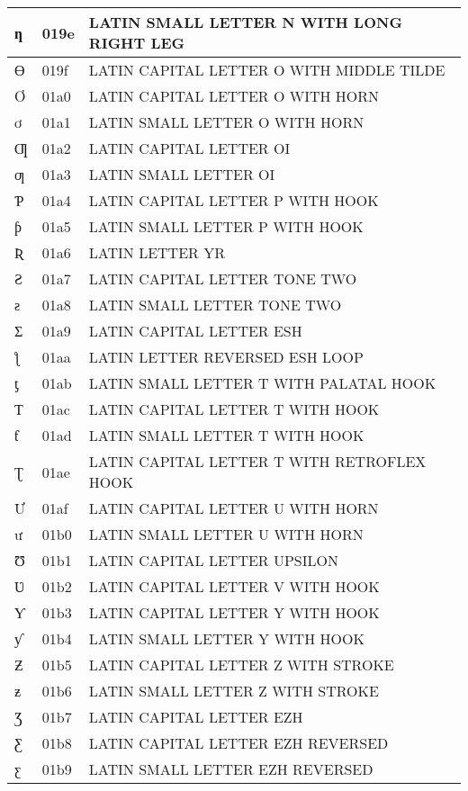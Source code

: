 \documentclass[12pt,letterpaper,openany]{book}
\begin{document}
\begin{center}
\begin{supertabular}{|m{0.25in}|m{0.5in}|m{4in}|}
			ƞ & 019e & LATIN SMALL LETTER N WITH LONG RIGHT LEG\\\hline
			Ɵ & 019f & LATIN CAPITAL LETTER O WITH MIDDLE TILDE\\\hline
			Ơ & 01a0 & LATIN CAPITAL LETTER O WITH HORN\\\hline
			ơ & 01a1 & LATIN SMALL LETTER O WITH HORN\\\hline
			Ƣ & 01a2 & LATIN CAPITAL LETTER OI\\\hline
			ƣ & 01a3 & LATIN SMALL LETTER OI\\\hline
			Ƥ & 01a4 & LATIN CAPITAL LETTER P WITH HOOK\\\hline
			ƥ & 01a5 & LATIN SMALL LETTER P WITH HOOK\\\hline
			Ʀ & 01a6 & LATIN LETTER YR\\\hline
			Ƨ & 01a7 & LATIN CAPITAL LETTER TONE TWO\\\hline
			ƨ & 01a8 & LATIN SMALL LETTER TONE TWO\\\hline
			Ʃ & 01a9 & LATIN CAPITAL LETTER ESH\\\hline
			ƪ & 01aa & LATIN LETTER REVERSED ESH LOOP\\\hline
			ƫ & 01ab & LATIN SMALL LETTER T WITH PALATAL HOOK\\\hline
			Ƭ & 01ac & LATIN CAPITAL LETTER T WITH HOOK\\\hline
			ƭ & 01ad & LATIN SMALL LETTER T WITH HOOK\\\hline
			Ʈ & 01ae & LATIN CAPITAL LETTER T WITH RETROFLEX HOOK\\\hline
			Ư & 01af & LATIN CAPITAL LETTER U WITH HORN\\\hline
			ư & 01b0 & LATIN SMALL LETTER U WITH HORN\\\hline
			Ʊ & 01b1 & LATIN CAPITAL LETTER UPSILON\\\hline
			Ʋ & 01b2 & LATIN CAPITAL LETTER V WITH HOOK\\\hline
			Ƴ & 01b3 & LATIN CAPITAL LETTER Y WITH HOOK\\\hline
			ƴ & 01b4 & LATIN SMALL LETTER Y WITH HOOK\\\hline
			Ƶ & 01b5 & LATIN CAPITAL LETTER Z WITH STROKE\\\hline
			ƶ & 01b6 & LATIN SMALL LETTER Z WITH STROKE\\\hline
			Ʒ & 01b7 & LATIN CAPITAL LETTER EZH\\\hline
			Ƹ & 01b8 & LATIN CAPITAL LETTER EZH REVERSED\\\hline
			ƹ & 01b9 & LATIN SMALL LETTER EZH REVERSED\\\hline

\end{supertabular}
\end{center}
\end{document}
